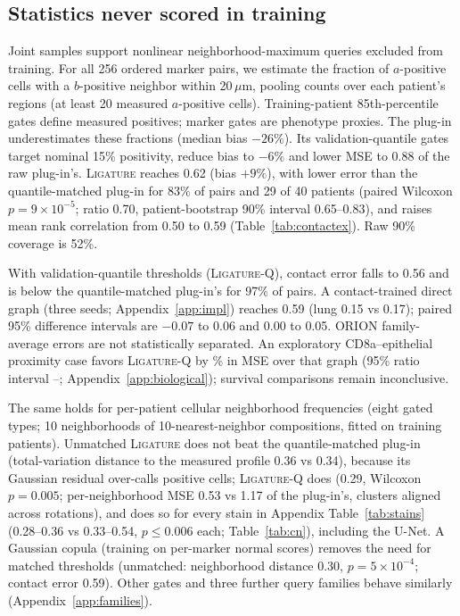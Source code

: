 \documentclass[10pt,letterpaper]{article}
\theoremstyle{definition}
\theoremstyle{remark}
\newcommand{\method}{\textnormal{\textsc{Ligature}}}
\begin{document}
\subsection{Statistics never scored in training}
\label{sec:unscored}
Joint samples support nonlinear neighborhood-maximum queries excluded from training. For all 256 ordered marker pairs, we estimate the fraction of $a$-positive cells with a $b$-positive neighbor within 20\,$\mu$m, pooling counts over each patient's regions (at least 20 measured $a$-positive cells). Training-patient 85th-percentile gates define measured positives; marker gates are phenotype proxies. The plug-in underestimates these fractions (median bias $-26\%$). Its validation-quantile gates target nominal 15\% positivity, reduce bias to $-6\%$ and lower MSE to 0.88 of the raw plug-in's. \method{} reaches 0.62 (bias $+9\%$), with lower error than the quantile-matched plug-in for 83\% of pairs and 29 of 40 patients (paired Wilcoxon $p=9\times10^{-5}$; ratio 0.70, patient-bootstrap 90\% interval 0.65--0.83), and raises mean rank correlation from 0.50 to 0.59 (Table~\ref{tab:contactex}). Raw 90\% coverage is 52\%.

With validation-quantile thresholds (\method{}-Q), contact error falls to 0.56 and is below the quantile-matched plug-in's for 97\% of pairs. A contact-trained direct graph (three seeds; Appendix~\ref{app:impl}) reaches 0.59 (lung 0.15 vs 0.17); paired 95\% difference intervals are $-0.07$ to 0.06 and 0.00 to 0.05. ORION family-average errors are not statistically separated. An exploratory CD8a--epithelial proximity case favors \method{}-Q by \BioContactPercent\% in MSE over that graph (95\% ratio interval \BioContactLo--\BioContactHi; Appendix~\ref{app:biological}); survival comparisons remain inconclusive.

The same holds for per-patient cellular neighborhood frequencies \citep{schurch2020} (eight gated types; 10 neighborhoods of 10-nearest-neighbor compositions, fitted on training patients). Unmatched \method{} does not beat the quantile-matched plug-in (total-variation distance to the measured profile 0.36 vs 0.34), because its Gaussian residual over-calls positive cells; \method{}-Q does (0.29, Wilcoxon $p=0.005$; per-neighborhood MSE 0.53 vs 1.17 of the plug-in's, clusters aligned across rotations), and does so for every stain in Appendix Table~\ref{tab:stains} (0.28--0.36 vs 0.33--0.54, $p\le0.006$ each; Table~\ref{tab:cn}), including the U-Net. A Gaussian copula (training on per-marker normal scores) removes the need for matched thresholds (unmatched: neighborhood distance 0.30, $p=5\times10^{-4}$; contact error 0.59). Other gates and three further query families behave similarly (Appendix~\ref{app:families}).
\end{document}
